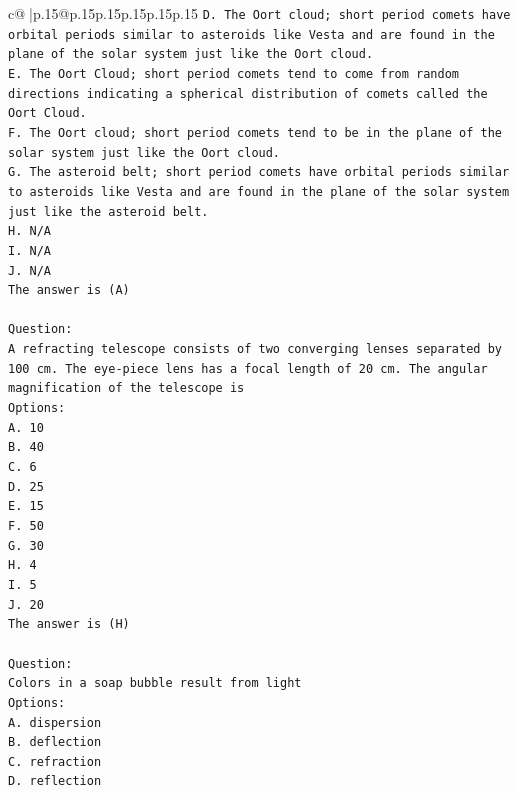 \documentclass{article}
\begin{document}
{\begin{supertabular}{c@{$\;$}|p{.15\linewidth}@{}p{.15\linewidth}p{.15\linewidth}p{.15\linewidth}p{.15\linewidth}p{.15\linewidth}}
{{{\texttt{D. The Oort cloud; short period comets have orbital periods similar to asteroids like Vesta and are found in the plane of the solar system just like the Oort cloud.} \\
\texttt{E. The Oort Cloud; short period comets tend to come from random directions indicating a spherical distribution of comets called the Oort Cloud.} \\
\texttt{F. The Oort cloud; short period comets tend to be in the plane of the solar system just like the Oort cloud.} \\
\texttt{G. The asteroid belt; short period comets have orbital periods similar to asteroids like Vesta and are found in the plane of the solar system just like the asteroid belt.} \\
\texttt{H. N/A} \\
\texttt{I. N/A} \\
\texttt{J. N/A} \\
\texttt{The answer is (A)} \\
\\ 
\texttt{Question:} \\
\texttt{A refracting telescope consists of two converging lenses separated by 100 cm. The eye{-}piece lens has a focal length of 20 cm. The angular magnification of the telescope is} \\
\texttt{Options:} \\
\texttt{A. 10} \\
\texttt{B. 40} \\
\texttt{C. 6} \\
\texttt{D. 25} \\
\texttt{E. 15} \\
\texttt{F. 50} \\
\texttt{G. 30} \\
\texttt{H. 4} \\
\texttt{I. 5} \\
\texttt{J. 20} \\
\texttt{The answer is (H)} \\
\\ 
\texttt{Question:} \\
\texttt{Colors in a soap bubble result from light} \\
\texttt{Options:} \\
\texttt{A. dispersion} \\
\texttt{B. deflection} \\
\texttt{C. refraction} \\
\texttt{D. reflection} \\
}}}
\end{supertabular}}
\end{document}
